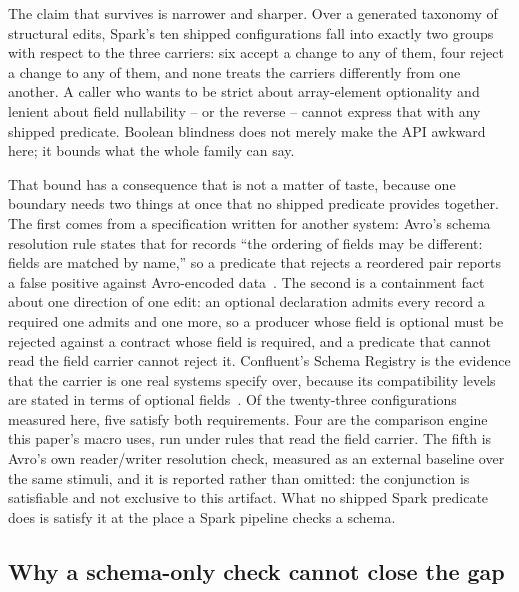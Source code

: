 The claim that survives is narrower and sharper. Over a generated taxonomy of structural edits, Spark's ten shipped configurations fall into exactly two groups with respect to the three carriers: six accept a change to any of them, four reject a change to any of them, and none treats the carriers differently from one another. A caller who wants to be strict about array-element optionality and lenient about field nullability -- or the reverse -- cannot express that with any shipped predicate. Boolean blindness does not merely make the API awkward here; it bounds what the whole family can say.

That bound has a consequence that is not a matter of taste, because one boundary needs two things at once that no shipped predicate provides together. The first comes from a specification written for another system: Avro's schema resolution rule states that for records ``the ordering of fields may be different: fields are matched by name,'' so a predicate that rejects a reordered pair reports a false positive against Avro-encoded data~\cite{avro_spec}. The second is a containment fact about one direction of one edit: an optional declaration admits every record a required one admits and one more, so a producer whose field is optional must be rejected against a contract whose field is required, and a predicate that cannot read the field carrier cannot reject it. Confluent's Schema Registry is the evidence that the carrier is one real systems specify over, because its compatibility levels are stated in terms of optional fields~\cite{avro_compatibility}. Of the twenty-three configurations measured here, five satisfy both requirements. Four are the comparison engine this paper's macro uses, run under rules that read the field carrier. The fifth is Avro's own reader/writer resolution check, measured as an external baseline over the same stimuli, and it is reported rather than omitted: the conjunction is satisfiable and not exclusive to this artifact. What no shipped Spark predicate does is satisfy it at the place a Spark pipeline checks a schema.

\subsection{Why a schema-only check cannot close the gap}

